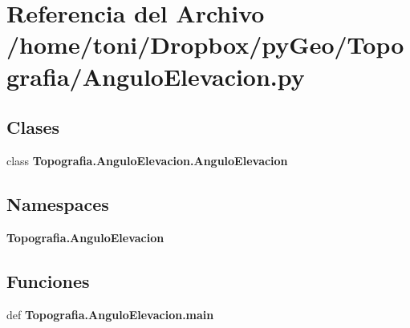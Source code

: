\section{Referencia del Archivo /home/toni/\-Dropbox/py\-Geo/\-Topografia/\-Angulo\-Elevacion.py}
\label{AnguloElevacion_8py}
\subsection*{Clases}
\begin{DoxyCompactItemize}
\item 
class {\bf Topografia.\-Angulo\-Elevacion.\-Angulo\-Elevacion}
\end{DoxyCompactItemize}
\subsection*{Namespaces}
\begin{DoxyCompactItemize}
\item 
{\bf Topografia.\-Angulo\-Elevacion}
\end{DoxyCompactItemize}
\subsection*{Funciones}
\begin{DoxyCompactItemize}
\item 
def {\bf Topografia.\-Angulo\-Elevacion.\-main}
\end{DoxyCompactItemize}
